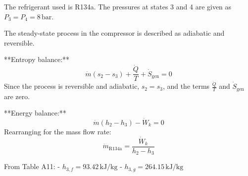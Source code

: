 The refrigerant used is R134a.  
The pressures at states 3 and 4 are given as \( P_3 = P_4 = 8 \, \text{bar} \).  

The steady-state process in the compressor is described as adiabatic and reversible.  

**Entropy balance:**  
\[
\dot{m} (s_2 - s_3) + \frac{\dot{Q}}{T} + \dot{S}_{\text{gen}} = 0
\]  
Since the process is reversible and adiabatic, \( s_2 = s_3 \), and the terms \( \frac{\dot{Q}}{T} \) and \( \dot{S}_{\text{gen}} \) are zero.  

**Energy balance:**  
\[
\dot{m} (h_2 - h_3) - \dot{W}_k = 0
\]  
Rearranging for the mass flow rate:  
\[
\dot{m}_{\text{R134a}} = \frac{\dot{W}_k}{h_2 - h_3}
\]  

From Table A11:  
- \( h_{3,f} = 93.42 \, \text{kJ/kg} \)  
- \( h_{3,g} = 264.15 \, \text{kJ/kg} \)
